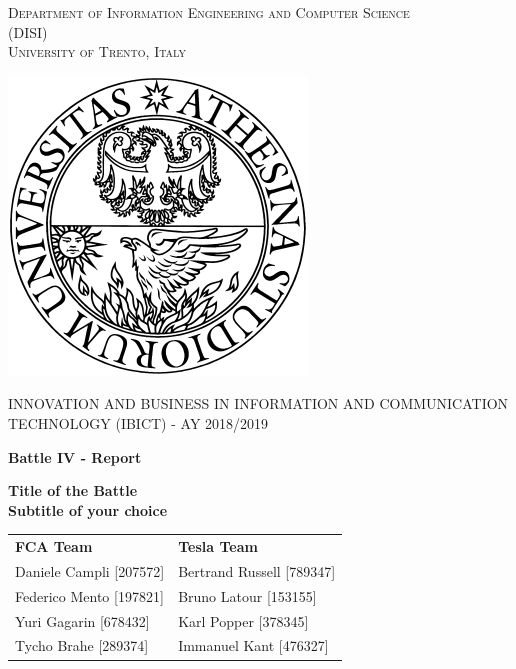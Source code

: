 \begin{titlepage}
	\begin{center}
   	{\scshape\LARGE
    	Department of Information Engineering and Computer Science\\ 
      	(DISI)\\ 
      	University of Trento, Italy\\\par}
      	\vspace{1cm}
      	\includegraphics[scale=0.5]{resources/logo}\\
	\vspace{1cm}
	{\scshape\Large INNOVATION AND BUSINESS IN INFORMATION AND COMMUNICATION TECHNOLOGY (IBICT) - AY 2018/2019\par}
	\vspace{1.5cm}
	{\huge\bfseries Battle IV - Report\\\par}
	\vspace{1cm}
	{\Large\bfseries Title of the Battle\\
	Subtitle of your choice\par}
      	\vfill
        \begin{tabular}{ll}
        \textbf{FCA Team}           &       \textbf{Tesla Team}         \\
       	Daniele Campli [207572]     &       Bertrand Russell [789347]   \\
	    Federico Mento [197821]     &       Bruno Latour [153155]       \\
	    Yuri Gagarin [678432]       &       Karl Popper [378345]        \\
	    Tycho Brahe [289374]        &       Immanuel Kant [476327]      \\
        \end{tabular}
      	\vfill
      	\vfill
	\end{center}
\end{titlepage}

